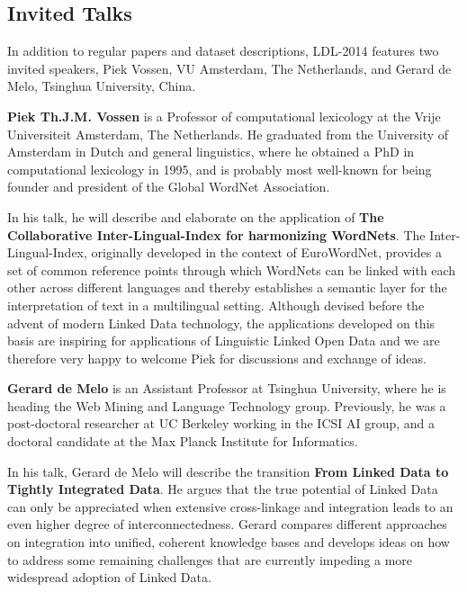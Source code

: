 \subsection{Invited Talks}

In addition to regular papers and dataset descriptions, LDL-2014 features two invited speakers, Piek Vossen, VU Amsterdam, The Netherlands, and Gerard de Melo, Tsinghua University, China.

\smallskip

\textbf{Piek Th.J.M. Vossen} is a Professor of computational lexicology at the Vrije Universiteit Amsterdam, The Netherlands. He graduated from the University of Amsterdam in Dutch and general linguistics, where he obtained a PhD in computational lexicology in 1995, and is probably most well-known for being founder and president of the Global WordNet Association.

In his talk, he will describe and elaborate on the application of \textbf{The Collaborative Inter-Lingual-Index for harmonizing WordNets}. 
The Inter-Lingual-Index, originally developed in the context of EuroWordNet, provides a set of common reference points through which WordNets can be linked with each other across different languages and thereby establishes a semantic layer for the interpretation of text in a multilingual setting. Although devised before the advent of modern Linked Data technology, the applications developed on this basis are inspiring for applications of Linguistic Linked Open Data and we are therefore very happy to welcome Piek for discussions and exchange of ideas.


\smallskip

\textbf{Gerard de Melo} is an Assistant Professor at Tsinghua
 University, where he is heading the Web Mining and Language Technology
 group. Previously, he was a post-doctoral researcher at UC Berkeley
 working in the ICSI AI group, and a doctoral candidate at the Max Planck
 Institute for Informatics.

In his talk, Gerard de Melo will describe the transition \textbf{From Linked Data to Tightly Integrated Data}. 
He argues that the true potential of Linked Data can only be appreciated when extensive cross-linkage and integration leads to an even higher degree of interconnectedness. Gerard compares different approaches on integration into unified, coherent knowledge bases and develops ideas on how to address some remaining challenges that are currently
 impeding a more widespread adoption of Linked Data. 
